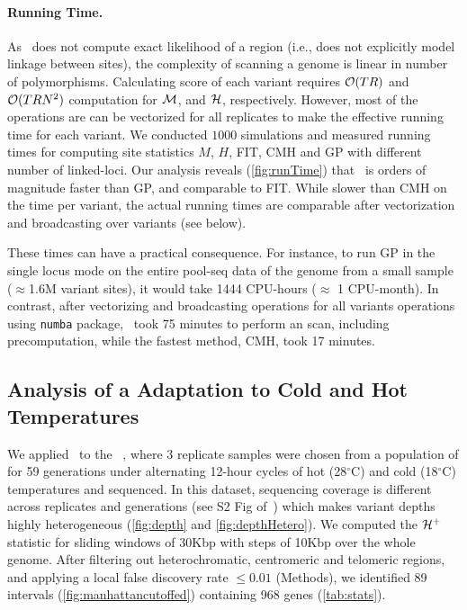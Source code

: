 \paragraph{Running Time.}
As \comale\ does not compute exact likelihood of a region (i.e., does
not explicitly model linkage between sites), the complexity of
scanning a genome is linear in number of polymorphisms.  Calculating
score of each variant requires ${\cal O}(TR)$ and ${\cal O}(TRN^2)$ computation
for ${\cal M}$, and ${\cal H}$, respectively. However, most of the operations
are can be vectorized for all replicates to make the effective running
time for each variant.  We
conducted $1000$ simulations and measured running times for computing site 
statistics $M$, $H$, FIT, CMH and GP with different number of linked-loci.  Our
analysis reveals (\ref{fig:runTime}) that \comale\ is orders of
magnitude faster than GP, and comparable to FIT. While slower than CMH
on the time per variant, the actual running times are comparable after
vectorization and broadcasting over variants (see below).

These times can have a practical consequence. For instance, to run GP
in the single locus mode on the entire pool-seq data of the \dmel genome from a
small sample ($\approx$1.6M variant sites), it would take 1444 CPU-hours
($\approx$ 1 CPU-month). In contrast, after vectorizing and
broadcasting operations for all variants operations using
\texttt{numba} package, \comale\ took 75 minutes to perform an
scan, including precomputation, while the fastest method, CMH, took 17 minutes.

\subsection{Analysis of a \dmel Adaptation to Cold and Hot 
Temperatures}\label{sec:dmel}
We applied \comale\ to the 
\datadm~\cite{orozco2012adaptation,franssen2015patterns}, where
3 replicate samples were chosen from a population of \dmel for 59
generations under alternating 12-hour cycles of hot (28$^{\circ}$C)
and cold (18$^{\circ}$C) temperatures and sequenced.  In this dataset,
sequencing coverage is different across replicates and generations
(see S2 Fig of~\cite{Terhorst2015Multi}) which makes variant depths
highly heterogeneous (\ref{fig:depth} and \ref{fig:depthHetero}). We 
computed the
${\cal H}^{+}$ statistic for sliding windows of 30Kbp with steps of 10Kbp
over the whole genome. After filtering out heterochromatic,
centromeric and telomeric
regions\cite{fiston2010drosophila,comeron2012many}, and applying a
local false discovery rate $\le 0.01$ (Methods), we identified 89
intervals (\ref{fig:manhattancutoffed}) containing 968 genes
(\ref{tab:stats}).

